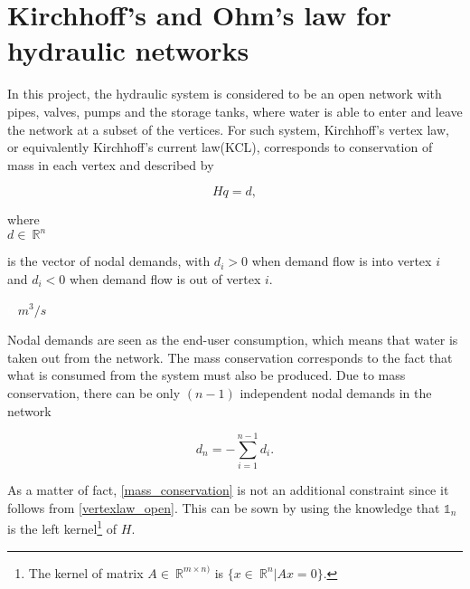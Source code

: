 \section{Kirchhoff's and Ohm's law for hydraulic networks}
\label{kirchhoffs_law}

In this project, the hydraulic system is considered to be an open network with pipes, valves, pumps and the storage tanks, where water is able to enter and leave the network at a subset of the vertices. For such system, Kirchhoff's vertex law, or equivalently Kirchhoff's current law(KCL), corresponds to conservation of mass in each vertex and described by

\begin{equation}
  \label{vertexlaw_open}
  Hq = d,
\end{equation}

  \begin{minipage}[t]{0.20\textwidth}
where\\
\hspace*{8mm} $d \in \: \mathbb{R}^{n}$ 
\end{minipage}
\begin{minipage}[t]{0.68\textwidth}
\vspace*{2mm}
is the vector of nodal demands, with $d_i > 0$ when demand flow is into vertex $i$ and $d_i < 0$ when demand flow is out of vertex $i$.
\end{minipage}
\begin{minipage}[t]{0.10\textwidth}
\vspace*{2mm}
\textcolor{White}{te}$\unit{m^3/s}$
\end{minipage}

Nodal demands are seen as the end-user consumption, which means that water is taken out from the network. The mass conservation corresponds to the fact that what is consumed from the system must also be produced. Due to mass conservation, there can be only $(n-1)$ independent nodal demands in the network

\begin{equation}
  \label{mass_conservation}
  d_n = - \sum_{i=1}^{n-1} d_i.
\end{equation}

As a matter of fact, \eqref{mass_conservation} is not an additional constraint since it follows from \eqref{vertexlaw_open}. This can be sown by using the knowledge that $\mathds{1}_n$ is the left kernel\footnote{The kernel of matrix $A \in \: \mathbb{R}^{m \times n)}$ is $ \{x \in \: \mathbb{R}^{n} | Ax = 0 \} $.} of $H$.

